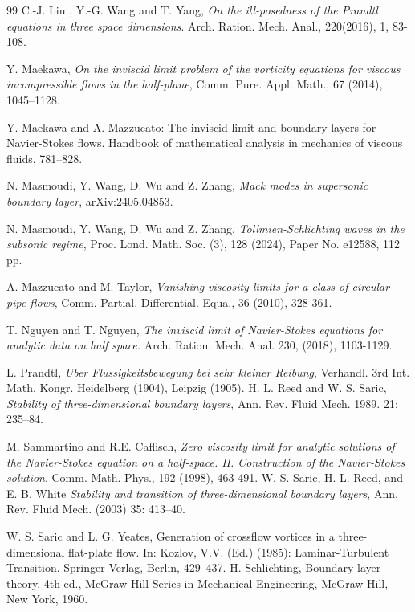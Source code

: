 \documentclass[reqno,11pt]{amsart}
\numberwithin{equation}{section}
\numberwithin{equation}{section}
\theoremstyle{plain}
\begin{document}
\begin{thebibliography}{99}
C.-J. Liu , Y.-G. Wang and T. Yang, {\it On the ill-posedness of the Prandtl equations in three space dimensions}. Arch. Ration. Mech. Anal., 220(2016), 1, 83-108.


 Y. Maekawa, {\it On the inviscid limit problem of the vorticity equations for viscous incompressible flows in the half-plane}, Comm. Pure. Appl. Math., 67 (2014), 1045–1128.

 Y. Maekawa and A. Mazzucato: {The inviscid limit and boundary layers for Navier-Stokes flows.} Handbook of mathematical analysis in mechanics of viscous fluids, 781--828.

 N. Masmoudi, Y. Wang, D. Wu and Z. Zhang, {\it  Mack modes in supersonic boundary layer}, arXiv:2405.04853.

 N. Masmoudi, Y. Wang, D. Wu and Z. Zhang, {\it Tollmien-Schlichting waves in the subsonic regime},  Proc. Lond. Math. Soc. (3), 128 (2024),  Paper No. e12588, 112 pp. 

 A. Mazzucato and M. Taylor, {\it Vanishing viscosity limits for a class of circular pipe flows}, Comm. Partial. Differential. Equa., 36 (2010), 328-361.

 T. Nguyen and T. Nguyen, {\it The inviscid limit of Navier-Stokes equations for analytic data on half space.} Arch. Ration. Mech. Anal. 230, (2018), 1103-1129.

 L. Prandtl, {\it Uber Flussigkeitsbewegung bei sehr kleiner Reibung},  Verhandl. 3rd Int. Math. Kongr. Heidelberg (1904), Leipzig (1905).
 H. L. Reed and W. S. Saric, {\it Stability of three-dimensional boundary layers}, Ann. Rev. Fluid Mech. 1989. 21: 235--84.

M. Sammartino and R.E. Caflisch, {\it Zero viscosity limit for analytic solutions of the Navier-Stokes equation on a half-space.
	II. Construction of the Navier-Stokes solution}. Comm. Math. Phys., 192 (1998), 463-491.
 W. S. Saric,  H. L. Reed, and E. B. White {\it Stability and transition of three-dimensional boundary layers}, Ann. Rev. Fluid Mech. (2003) 35: 413--40.

 W. S. Saric and L. G. Yeates, Generation of crossflow vortices in a three-dimensional flat-plate flow. In: Kozlov, V.V. (Ed.) (1985): Laminar-Turbulent Transition. Springer-Verlag, Berlin, 429–437.
%
 H. Schlichting, Boundary layer theory, 4th ed., McGraw-Hill Series in Mechanical Engineering, McGraw-Hill, New York, 1960.



\end{thebibliography}
\end{document}
